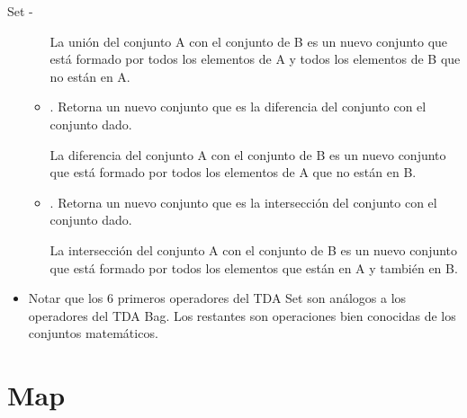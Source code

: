 \documentclass[10pt,envcountsect,spanish]{beamer}
\begin{document}
\begin{frame}[allowframebreaks]{Set -}
\begin{itemize}
\begin{itemize}
La unión del conjunto A  con el conjunto de B es un nuevo conjunto que está formado por todos los elementos de A y todos los elementos de B que no están en A.


\item {}.  Retorna un nuevo conjunto que es la diferencia del conjunto con el conjunto dado.

La diferencia del conjunto A  con el conjunto de B es un nuevo conjunto que está formado por todos los elementos de A que no están en B.


\item {}.  Retorna un nuevo conjunto que es la intersección del conjunto con el conjunto dado.

La intersección del conjunto A  con el conjunto de B es un nuevo conjunto que está formado por todos los elementos que están en A y también en B.

\end{itemize}

\item Notar que los 6 primeros operadores del TDA Set son análogos a los operadores del TDA Bag. Los restantes son operaciones bien conocidas de los conjuntos matemáticos.


\end{itemize}

\end{frame}




\section{Map}
\end{document}

